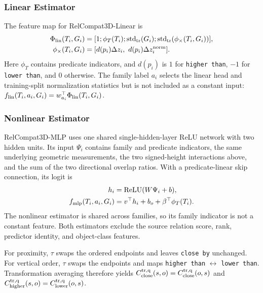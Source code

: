 \subsubsection{Linear Estimator}
The feature map for RelCompat3D-Linear is 
\begin{equation}
\begin{aligned}
\Phi_{\rm lin}(T_i,G_i)&=[1;\phi_T(T_i);\operatorname{std}_{\rm tr}(G_i);
\operatorname{std}_{\rm tr}(\phi_{\times}(T_i,G_i))],\\
\phi_{\times}(T_i,G_i)&=
[d(p_i)\Delta z_i,\ d(p_i)\Delta z_i^{\rm norm}].
\end{aligned}
\end{equation}
Here $\phi_T$ contains predicate indicators, and $d(p_i)$ is $1$ for \texttt{higher than}, $-1$ for \texttt{lower than}, and $0$ otherwise. The family label $a_i$ selects the linear head and training-split normalization statistics but is not included as a  constant input: $f_{\rm lin}(T_i,a_i,G_i)=w_{a_i}^\top\Phi_{\rm lin}(T_i,G_i)$.

\subsubsection{Nonlinear Estimator}
RelCompat3D-MLP uses one shared single-hidden-layer ReLU network with two hidden units. Its input $\Psi_i$ contains family and predicate indicators, the same underlying geometric measurements, the two signed-height interactions above, and the sum of the two directional overlap ratios. With a predicate-linear skip connection, its logit is
\begin{equation}
\begin{aligned}
h_i&=\operatorname{ReLU}(W\Psi_i+b),\\
f_{\rm mlp}(T_i,a_i,G_i)&=v^\top h_i+b_o+
\beta^\top\phi_T(T_i).
\end{aligned}
\end{equation}
The nonlinear estimator is shared across families, so its family indicator is not a constant feature. Both estimators exclude the source relation score, rank, predictor identity, and object-class features.

For proximity, $\tau$ swaps the ordered endpoints and leaves \texttt{close by} unchanged. For vertical order, $\tau$ swaps the endpoints and maps \texttt{higher than} $\leftrightarrow$ \texttt{lower than}. Transformation averaging therefore yields 
$C^{\rm tr,q}_{\rm close}(s,o)=C^{\rm tr,q}_{\rm close}(o,s)$ and
$C^{\rm tr,q}_{\rm higher}(s,o)=C^{\rm tr,q}_{\rm lower}(o,s)$.

